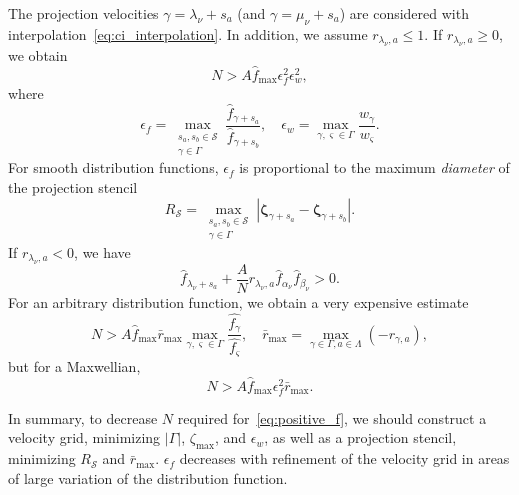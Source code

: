 \documentclass[review]{elsarticle}
\newcommand{\bzeta}{\boldsymbol{\zeta}}
\begin{document}
The projection velocities \(\gamma = \lambda_\nu+s_a\) (and \(\gamma = \mu_\nu+s_a\))
are considered with interpolation~\eqref{eq:ci_interpolation}.
In addition, we assume \(r_{\lambda_\nu,a} \leq 1\).
If \(r_{\lambda_\nu,a} \geq 0\), we obtain
\begin{equation}\label{eq:positive_f_lambda2+}
    N > A \hat{f}_{\max} \epsilon_f^2 \epsilon_w^2,
\end{equation}
where
\begin{equation}\label{eq:epsilon_f}
    \epsilon_f = \max_{\substack{s_a,s_b\in\mathcal{S}\\\gamma\in\Gamma}} \frac{\hat{f}_{\gamma+s_a}}{\hat{f}_{\gamma+s_b}}, \quad
    \epsilon_w = \max_{\gamma,\varsigma\in\Gamma} \frac{w_\gamma}{w_\varsigma}.
\end{equation}
For smooth distribution functions, \(\epsilon_f\) is proportional to the maximum \emph{diameter} of the projection stencil
\begin{equation}\label{eq:stencil_diameter}
    R_\mathcal{S} = \max_{\substack{s_a,s_b\in\mathcal{S}\\\gamma\in\Gamma}}
        \left| \bzeta_{\gamma+s_a} - \bzeta_{\gamma+s_b} \right|.
\end{equation}
If \(r_{\lambda_\nu,a} < 0\), we have
\begin{equation}\label{eq:positive_f_lambda-}
    \hat{f}_{\lambda_\nu+s_a} + \frac{A}{N}r_{\lambda_\nu,a} \hat{f}_{\alpha_\nu}\hat{f}_{\beta_\nu} > 0.
\end{equation}
For an arbitrary distribution function, we obtain a very expensive estimate
\begin{equation}\label{eq:positive_f_lambda2-}
    N > A \hat{f}_{\max} \bar{r}_{\max} \max_{\gamma,\varsigma\in\Gamma}\frac{\hat{f_\gamma}}{\hat{f_\varsigma}}, \quad
    \bar{r}_{\max} = \max_{\gamma\in\Gamma,a\in\Lambda}( -r_{\gamma,a} ),
\end{equation}
but for a Maxwellian,
\begin{equation}\label{eq:positive_f_lambda2-maxw}
    N > A \hat{f}_{\max} \epsilon_f^2 \bar{r}_{\max}.
\end{equation}

In summary, to decrease \(N\) required for~\eqref{eq:positive_f},
we should construct a velocity grid, minimizing \(|\Gamma|\), \(\zeta_{\max}\), and \(\epsilon_w\),
as well as a projection stencil, minimizing \(R_\mathcal{S}\) and \(\bar{r}_{\max}\).
\(\epsilon_f\) decreases with refinement of the velocity grid in areas of large variation
of the distribution function.
\end{document}
